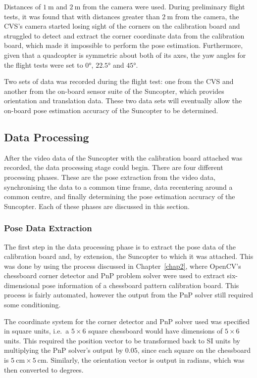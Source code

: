Distances of $\SI{1}{\m}$ and $\SI{2}{\m}$ from the camera were used. During preliminary flight tests, it was found that with distances greater than $\SI{2}{\m}$ from the camera, the CVS's camera started losing sight of the corners on the calibration board and struggled to detect and extract the corner coordinate data from the calibration board, which made it impossible to perform the pose estimation. Furthermore, given that a quadcopter is symmetric about both of its axes, the yaw angles for the flight tests were set to $\ang{0}$, $\ang{22.5}$ and $\ang{45}$. 

Two sets of data was recorded during the flight test: one from the CVS and another from the on-board sensor suite of the Suncopter, which provides orientation and translation data. These two data sets will eventually allow the on-board pose estimation accuracy of the Suncopter to be determined. 

\subsection{Data Processing}

After the video data of the Suncopter with the calibration board attached was recorded, the data processing stage could begin. There are four different processing phases. These are the pose extraction from the video data, synchronising the data to a common time frame, data recentering around a common centre, and finally determining the pose estimation accuracy of the Suncopter. Each of these phases are discussed in this section. 

\subsubsection{Pose Data Extraction}

The first step in the data processing phase is to extract the pose data of the calibration board and, by extension, the Suncopter to which it was attached. This was done by using the process discussed in Chapter~\ref{chap2}, where OpenCV's chessboard corner detector and PnP problem solver were used to extract six-dimensional pose information of a chessboard pattern calibration board. This process is fairly automated, however the output from the PnP solver still required some conditioning.

The coordinate system for the corner detector and PnP solver used was specified in square units, i.e.\ a $5\times6$ square chessboard would have dimensions of $5\times6$ units. This required the position vector to be transformed back to SI units by multiplying the PnP solver's output by $0.05$, since each square on the chessboard is $\SI{5}{\cm}\times\SI{5}{\cm}$. Similarly, the orientation vector is output in radians, which was then converted to degrees. 

